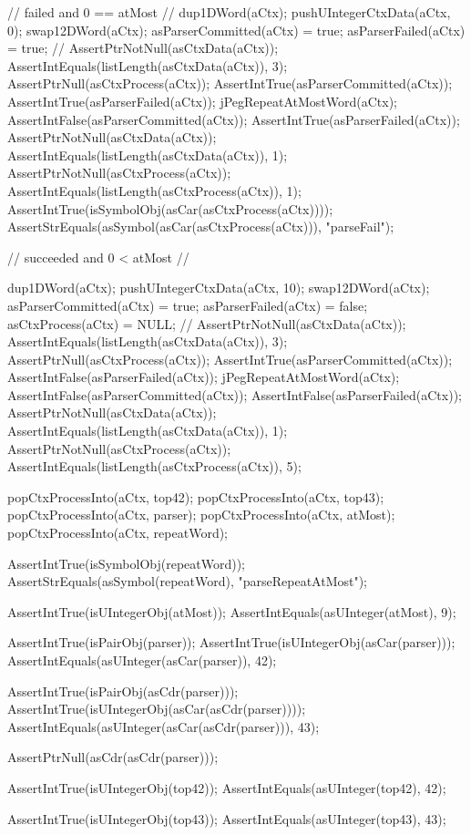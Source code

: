   // failed and 0 == atMost
  //
  dup1DWord(aCtx);
  pushUIntegerCtxData(aCtx, 0);
  swap12DWord(aCtx);
  asParserCommitted(aCtx) = true;
  asParserFailed(aCtx) = true;
  //
  AssertPtrNotNull(asCtxData(aCtx));
  AssertIntEquals(listLength(asCtxData(aCtx)), 3);
  AssertPtrNull(asCtxProcess(aCtx));
  AssertIntTrue(asParserCommitted(aCtx));
  AssertIntTrue(asParserFailed(aCtx));
  jPegRepeatAtMostWord(aCtx);
  AssertIntFalse(asParserCommitted(aCtx));
  AssertIntTrue(asParserFailed(aCtx));
  AssertPtrNotNull(asCtxData(aCtx));
  AssertIntEquals(listLength(asCtxData(aCtx)), 1);
  AssertPtrNotNull(asCtxProcess(aCtx));
  AssertIntEquals(listLength(asCtxProcess(aCtx)), 1);
  AssertIntTrue(isSymbolObj(asCar(asCtxProcess(aCtx))));
  AssertStrEquals(asSymbol(asCar(asCtxProcess(aCtx))), "parseFail");

  // succeeded and 0 < atMost 
  //
  {
  dup1DWord(aCtx);
  pushUIntegerCtxData(aCtx, 10);
  swap12DWord(aCtx);
  asParserCommitted(aCtx) = true;
  asParserFailed(aCtx) = false;
  asCtxProcess(aCtx) = NULL;
  //
  AssertPtrNotNull(asCtxData(aCtx));
  AssertIntEquals(listLength(asCtxData(aCtx)), 3);
  AssertPtrNull(asCtxProcess(aCtx));
  AssertIntTrue(asParserCommitted(aCtx));
  AssertIntFalse(asParserFailed(aCtx));
  jPegRepeatAtMostWord(aCtx);
  AssertIntFalse(asParserCommitted(aCtx));
  AssertIntFalse(asParserFailed(aCtx));
  AssertPtrNotNull(asCtxData(aCtx));
  AssertIntEquals(listLength(asCtxData(aCtx)), 1);
  AssertPtrNotNull(asCtxProcess(aCtx));
  AssertIntEquals(listLength(asCtxProcess(aCtx)), 5);
    
  popCtxProcessInto(aCtx, top42);
  popCtxProcessInto(aCtx, top43);
  popCtxProcessInto(aCtx, parser);
  popCtxProcessInto(aCtx, atMost);
  popCtxProcessInto(aCtx, repeatWord);
  
  AssertIntTrue(isSymbolObj(repeatWord));
  AssertStrEquals(asSymbol(repeatWord), "parseRepeatAtMost");
  
  AssertIntTrue(isUIntegerObj(atMost));
  AssertIntEquals(asUInteger(atMost), 9);
  
  AssertIntTrue(isPairObj(parser));
  AssertIntTrue(isUIntegerObj(asCar(parser)));
  AssertIntEquals(asUInteger(asCar(parser)), 42);
  
  AssertIntTrue(isPairObj(asCdr(parser)));
  AssertIntTrue(isUIntegerObj(asCar(asCdr(parser))));
  AssertIntEquals(asUInteger(asCar(asCdr(parser))), 43);
  
  AssertPtrNull(asCdr(asCdr(parser)));
  
  AssertIntTrue(isUIntegerObj(top42));
  AssertIntEquals(asUInteger(top42), 42);  

  AssertIntTrue(isUIntegerObj(top43));
  AssertIntEquals(asUInteger(top43), 43);
  }

